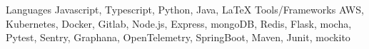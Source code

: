 \begin{cvskills}
  \cvskill
  {Languages}
  {Javascript, Typescript, Python, Java, \LaTeX}
  \cvskill
  {Tools/Frameworks}
  {AWS, Kubernetes, Docker, Gitlab, Node.js, Express, mongoDB, Redis, Flask, mocha, Pytest, Sentry, Graphana, OpenTelemetry, SpringBoot, Maven, Junit, mockito}
\end{cvskills}  